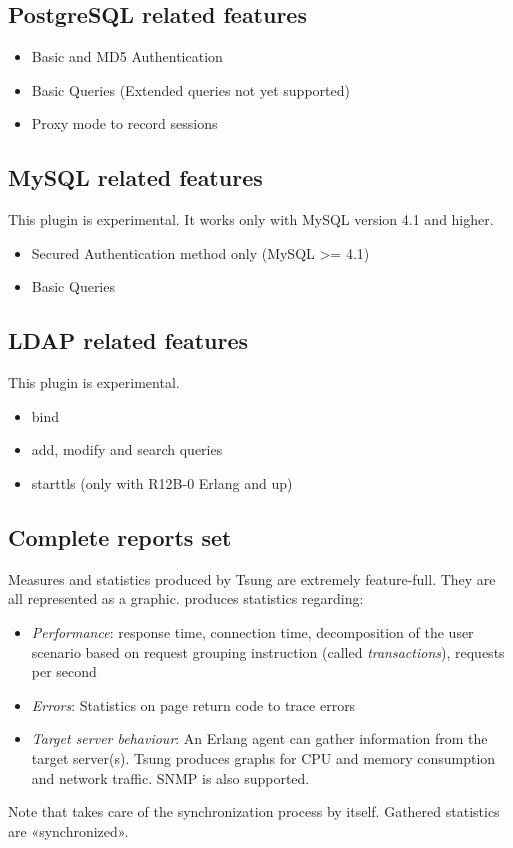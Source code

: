 \documentclass{IDXDOC-en}
\begin{document}
\subsection{PostgreSQL related features}

\begin{itemize}
\item Basic and MD5 Authentication
\item Basic Queries (Extended queries not yet supported)
\item Proxy mode to record sessions
\end{itemize}

\subsection{MySQL related features}
This plugin is experimental. It works only with MySQL version 4.1 and higher.
\begin{itemize}
\item Secured Authentication method only (MySQL >= 4.1)
\item Basic Queries
\end{itemize}

\subsection{LDAP related features}
This plugin is experimental.

\begin{itemize}
\item bind
\item add, modify and search queries
\item starttls (only with R12B-0 Erlang and up)
\end{itemize}

\subsection{Complete reports set}

Measures and statistics produced by Tsung are extremely feature-full.
They are all represented as a graphic.  produces
statistics regarding:

\begin{itemize}
\item \emph{Performance}: response time, connection time,  decomposition of the user scenario based on request grouping  instruction (called \textit{transactions}), requests per second
\item \emph{Errors}: Statistics on page return code to trace errors
\item \emph{Target server behaviour}: An Erlang agent can gather information
from the target server(s). Tsung produces graphs for CPU and memory
consumption and network traffic. SNMP is also supported.
\end{itemize}
\par Note that  takes care of the synchronization process
by itself. Gathered statistics are «synchronized».
\end{document}
